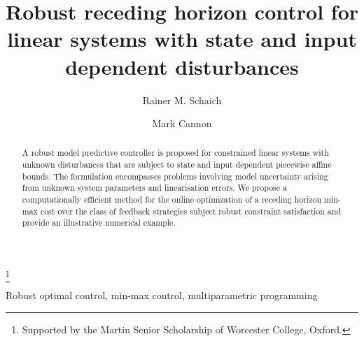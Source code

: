\documentclass{ifacconf}
\begin{document}
\begin{frontmatter}


\title{Robust receding horizon control for linear systems with state and input dependent disturbances}


\thanks[footnoteinfo]{Supported by the Martin Senior Scholarship of Worcester College, Oxford.}

\author[Oxford]{Rainer M. Schaich} 
\author[Oxford]{Mark Cannon} 

\address[Oxford]{Department of Engineering Science, University of Oxford, OX1 3PJ, UK. (e-mail: 
rainer.schaich@eng.ox.ac.uk, mark.cannon@eng.ox.ac.uk).}

\begin{abstract}                %
  A robust model predictive controller is proposed for constrained linear systems with unknown disturbances
  that are subject to state and input dependent piecewise affine bounds.
  The formulation encompasses problems involving model uncertainty arising from unknown system
  parameters and linearisation errors. We propose a computationally efficient method for the online
  optimization of a receding horizon min-max cost over the class of feedback strategies subject robust
  constraint satisfaction and provide an illustrative numerical example.
\end{abstract}

\begin{keyword}
Robust optimal control, min-max control, multiparametric programming 
\end{keyword}

\end{frontmatter}
\end{document}
